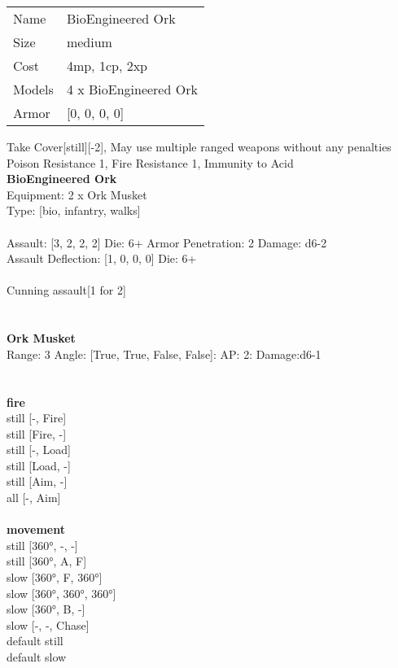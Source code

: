 \begin{tabular}{ll}
  Name & BioEngineered Ork \\
  Size & medium\\
  Cost & 4mp, 1cp, 2xp\\
  Models & 4 x BioEngineered Ork\\
  Armor & [0, 0, 0, 0]\\
\end{tabular}

\noindent Take Cover[still][-2], May use multiple ranged weapons without any penalties\\ 
Poison Resistance 1, Fire Resistance 1, Immunity to Acid\\ 


{\bf BioEngineered Ork } \\
Equipment: 2 x Ork Musket \\
Type: [bio, infantry, walks] \\
\ \\
Assault: [3, 2, 2, 2] Die: 6+ Armor Penetration: 2 Damage: d6-2 \\
Assault Deflection: [1, 0, 0, 0] Die: 6+\\
\\ 
Cunning assault[1 for 2]\\ 
 
\ \\

\ \\
{\bf Ork Musket } \\



Range: 3  Angle: [True, True, False, False]: AP: 2: Damage:d6-1 \\




 
\ \\




\ \\ {\bf fire } \\
still [-, Fire] \\
still [Fire, -] \\
still [-, Load] \\
still [Load, -] \\
still [Aim, -] \\
all [-, Aim] \\
\ \\ {\bf movement } \\
still [360°, -, -] \\
still [360°, A, F] \\
slow [360°, F, 360°] \\
slow [360°, 360°, 360°] \\
slow [360°, B, -] \\
slow [-, -, Chase] \\
default still \\
default slow \\


